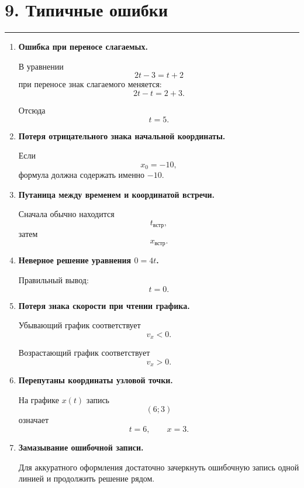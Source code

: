 \documentclass[a4paper,12pt]{article}
\newcommand{\sectionline}{%
    \vspace{-0.4em}
    {\color{accent}\rule{\linewidth}{0.7pt}}
    \vspace{0.4em}
}
\begin{document}
\section*{\color{darkaccent}9. Типичные ошибки}
\sectionline

\begin{enumerate}
    \item \textbf{Ошибка при переносе слагаемых.}

    В уравнении
    \[
    2t-3=t+2
    \]
    при переносе знак слагаемого меняется:
    \[
    2t-t=2+3.
    \]

    Отсюда
    \[
    t=5.
    \]

    \item \textbf{Потеря отрицательного знака начальной координаты.}

    Если
    \[
    x_0=-10,
    \]
    формула должна содержать именно \(-10\).

    \item \textbf{Путаница между временем и координатой встречи.}

    Сначала обычно находится
    \[
    t_{\text{встр}},
    \]
    затем
    \[
    x_{\text{встр}}.
    \]

    \item \textbf{Неверное решение уравнения \(0=4t\).}

    Правильный вывод:
    \[
    t=0.
    \]

    \item \textbf{Потеря знака скорости при чтении графика.}

    Убывающий график соответствует
    \[
    v_x<0.
    \]

    Возрастающий график соответствует
    \[
    v_x>0.
    \]

    \item \textbf{Перепутаны координаты узловой точки.}

    На графике \(x(t)\) запись
    \[
    (6;3)
    \]
    означает
    \[
    t=6,\qquad x=3.
    \]

    \item \textbf{Замазывание ошибочной записи.}

    Для аккуратного оформления достаточно зачеркнуть ошибочную запись одной линией и продолжить решение рядом.
\end{enumerate}

\end{document}
